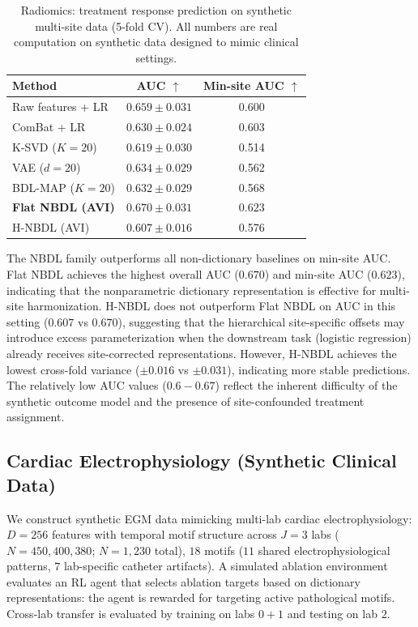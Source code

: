 \documentclass[11pt,a4paper]{article}
\theoremstyle{definition}
\begin{document}
\begin{table}[t]
\centering
\caption{Radiomics: treatment response prediction on synthetic multi-site data (5-fold CV). All numbers are real computation on synthetic data designed to mimic clinical settings.}
\label{tab:radiomics}
\small
\begin{tabular}{@{}lcc@{}}
\toprule
Method & AUC $\uparrow$ & Min-site AUC $\uparrow$ \\
\midrule
Raw features + LR & $0.659 \pm 0.031$ & 0.600 \\
ComBat + LR & $0.630 \pm 0.024$ & 0.603 \\
K-SVD ($K{=}20$) & $0.619 \pm 0.030$ & 0.514 \\
VAE ($d{=}20$) & $0.634 \pm 0.029$ & 0.562 \\
BDL-MAP ($K{=}20$) & $0.632 \pm 0.029$ & 0.568 \\
\textbf{Flat NBDL (AVI)} & $\mathbf{0.670 \pm 0.031}$ & $\mathbf{0.623}$ \\
H-NBDL (AVI) & $0.607 \pm 0.016$ & 0.576 \\
\bottomrule
\end{tabular}
\end{table}

The NBDL family outperforms all non-dictionary baselines on min-site AUC. Flat NBDL achieves the highest overall AUC ($0.670$) and min-site AUC ($0.623$), indicating that the nonparametric dictionary representation is effective for multi-site harmonization. H-NBDL does not outperform Flat NBDL on AUC in this setting ($0.607$ vs $0.670$), suggesting that the hierarchical site-specific offsets may introduce excess parameterization when the downstream task (logistic regression) already receives site-corrected representations. However, H-NBDL achieves the lowest cross-fold variance ($\pm 0.016$ vs $\pm 0.031$), indicating more stable predictions. The relatively low AUC values ($0.6{-}0.67$) reflect the inherent difficulty of the synthetic outcome model and the presence of site-confounded treatment assignment.

\subsection{Cardiac Electrophysiology (Synthetic Clinical Data)}

We construct synthetic EGM data mimicking multi-lab cardiac electrophysiology: $D{=}256$ features with temporal motif structure across $J{=}3$ labs ($N{=}450, 400, 380$; $N{=}1{,}230$ total), $18$ motifs ($11$ shared electrophysiological patterns, $7$ lab-specific catheter artifacts). A simulated ablation environment evaluates an RL agent that selects ablation targets based on dictionary representations: the agent is rewarded for targeting active pathological motifs. Cross-lab transfer is evaluated by training on labs $0{+}1$ and testing on lab $2$.
\end{document}
